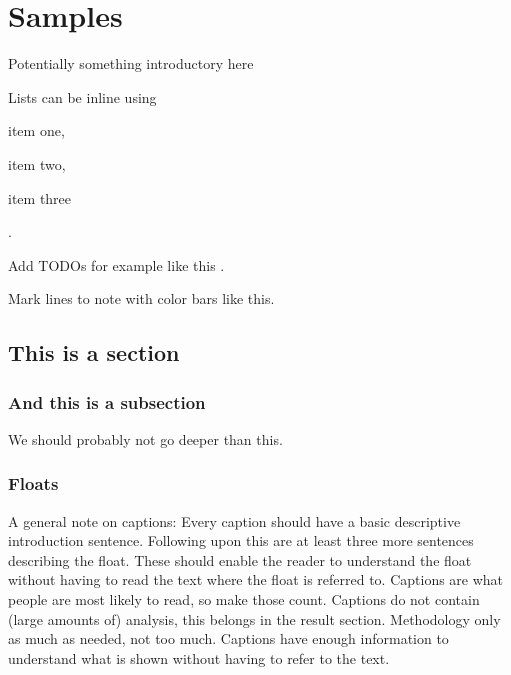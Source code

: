 \chapter{Samples}
\label{cp:samples}

Potentially something introductory here

Lists can be inline using \begin{inlinelist} \item item one, \item item two, \item item three \end{inlinelist}.

Add TODOs for example like this . \blindtext

Mark lines to note with color bars like this. \cbstart\blindtext \cbend
\section{This is a section}
\label{sec:samplesec}
\subsection{And this is a subsection}
\label{sec:asubsec}
We should probably not go deeper than this.
\subsection{Floats}
\label{sec:floats}
A general note on captions: Every caption should have a basic descriptive introduction sentence. Following upon this are at least three more sentences describing the float.
These should enable the reader to understand the float without having to read the text where the float is referred to. Captions are what people are most likely to read, so make those count.
Captions do not contain (large amounts of) analysis, this belongs in the result section. Methodology only as much as needed, not too much. Captions have enough information to understand
what is shown without having to refer to the text.

